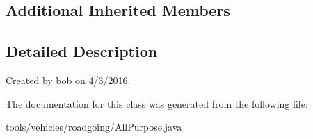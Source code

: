 \subsection*{Additional Inherited Members}


\subsection{Detailed Description}
Created by bob on 4/3/2016. 

The documentation for this class was generated from the following file\+:\begin{DoxyCompactItemize}
\item 
tools/vehicles/roadgoing/All\+Purpose.\+java\end{DoxyCompactItemize}
